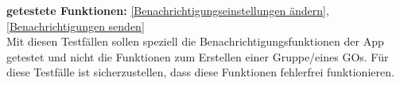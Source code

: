 \documentclass[parskip=full]{scrartcl}
\begin{document}
\textbf{getestete Funktionen: }\ref{Benachrichtigungseinstellungen ändern}, \ref{Benachrichtigungen senden} \\
Mit diesen Testfällen sollen speziell die Benachrichtigungsfunktionen der App getestet und nicht die Funktionen zum Erstellen einer Gruppe/eines GOs. Für diese Testfälle ist sicherzustellen, dass diese Funktionen fehlerfrei funktionieren.


\newpage
\printglossary	
\end{document}

